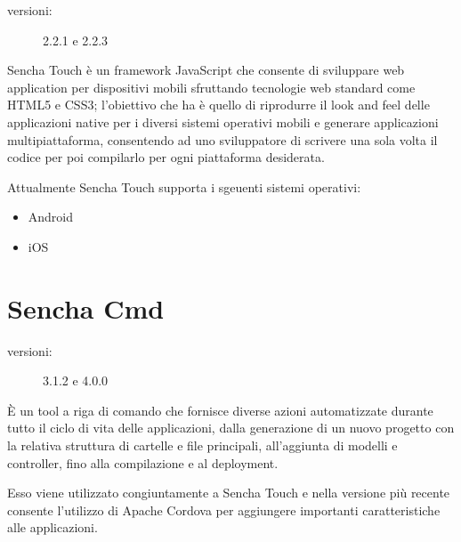 \begin{description}
\item[versioni:] 2.2.1 e 2.2.3
\end{description}

Sencha Touch è un framework JavaScript che consente di sviluppare web application per dispositivi mobili sfruttando tecnologie web standard come \acs{HTML5} e \acs{CSS3}; l'obiettivo che ha è quello di riprodurre il look and feel delle applicazioni native per i diversi sistemi operativi mobili e generare applicazioni multipiattaforma, consentendo ad uno sviluppatore di scrivere una sola volta il codice per poi compilarlo per ogni piattaforma desiderata.

Attualmente Sencha Touch supporta i sgeuenti sistemi operativi:
\begin{itemize}
\item Android
\item iOS
\end{itemize}

\section{Sencha Cmd}
\begin{description}
\item[versioni:] 3.1.2 e 4.0.0
\end{description}

È un tool a riga di comando che fornisce diverse azioni automatizzate durante tutto il ciclo di vita delle applicazioni, dalla generazione di un nuovo progetto con la relativa struttura di cartelle e file principali, all'aggiunta di modelli e controller, fino alla compilazione e al deployment.

Esso viene utilizzato congiuntamente a Sencha Touch e nella versione più recente consente l'utilizzo di Apache Cordova per aggiungere importanti caratteristiche alle applicazioni.
 
